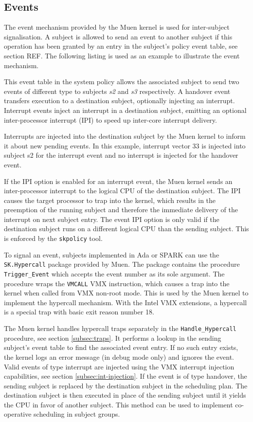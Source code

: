 \subsection{Events}\label{subsec:events}
The event mechanism provided by the Muen kernel is used for
inter-subject signalisation. A subject is allowed to send an event to another
subject if this operation has been granted by an entry in the subject's policy
event table, see section REF. The following listing is used as an example to
illustrate the event mechanism.



This event table in the system policy allows the associated subject to send two
events of different type to subjects \emph{s2} and \emph{s3} respectively. A
handover event transfers execution to a destination subject, optionally
injecting an interrupt.  Interrupt events inject an interrupt in a destination
subject, emitting an optional inter-processor interrupt (IPI) to
speed up inter-core interrupt delivery.

Interrupts are injected into the destination subject by the Muen kernel to
inform it about new pending events. In this example, interrupt vector 33 is
injected into subject s2 for the interrupt event and no interrupt is injected
for the handover event.

If the IPI option is enabled for an interrupt event, the Muen kernel sends an
inter-processor interrupt to the logical CPU of the destination subject. The
IPI causes the target processor to trap into the kernel, which results in the
preemption of the running subject and therefore the immediate delivery of the
interrupt on next subject entry. The event IPI option is only valid if the
destination subject runs on a different logical CPU than the sending subject.
This is enforced by the \texttt{skpolicy} tool.

To signal an event, subjects implemented in Ada or SPARK can use the
\texttt{SK.Hypercall} package provided by Muen. The package contains the
procedure \texttt{Trigger\_Event} which accepts the event number as its sole
argument. The procedure wraps the \texttt{VMCALL} VMX instruction, which causes
a trap into the kernel when called from VMX non-root mode. This is used by the
Muen kernel to implement the hypercall mechanism.  With the Intel VMX
extensions, a hypercall is a special trap with basic exit reason number 18.

The Muen kernel handles hypercall traps separately in the
\texttt{Handle\_Hypercall} procedure, see section \ref{subsec:traps}. It
performs a lookup in the sending subject's event table to find the associated
event entry. If no such entry exists, the kernel logs an error message (in
debug mode only) and ignores the event. Valid events of type interrupt are
injected using the VMX interrupt injection capabilities, see section
\ref{subsec:int-injection}. If the event is of type handover, the sending
subject is replaced by the destination subject in the scheduling plan. The
destination subject is then executed in place of the sending subject until it
yields the CPU in favor of another subject. This method can be used to implement
co-operative scheduling in subject groups.

